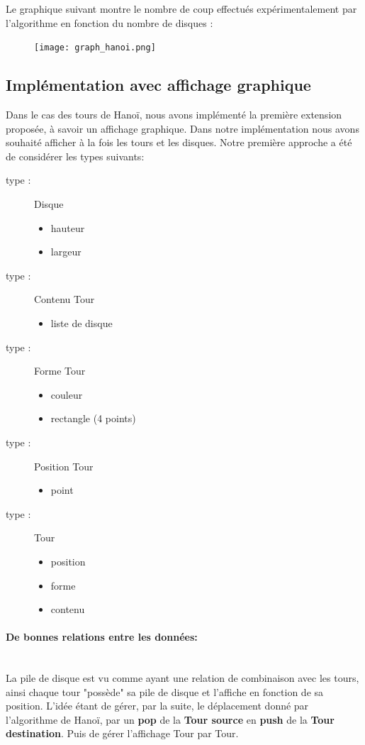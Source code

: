 \documentclass[a4paper,11pt]{article}
\begin{document}
Le graphique suivant montre le nombre de coup effectués expérimentalement par l'algorithme en fonction du nombre de disques :
\begin{figure}[h]
  \texttt{[image: graph\_hanoi.png]}
  \label{fig:graph_hanoi}
\end{figure}


\subsection{Implémentation avec affichage graphique}
Dans le cas des tours de Hanoï, nous avons implémenté la première extension proposée, à savoir un affichage graphique.
Dans notre implémentation nous avons souhaité afficher à la fois les tours et les disques.
Notre première approche a été de considérer les types suivants:

\begin{multicols}{3}
\begin{description}
\item[type :] Disque 
	\begin{itemize}
	\item hauteur
	\item largeur 
	\end{itemize}
\item[type :] Contenu Tour
	\begin{itemize}
	\item liste de disque
	\end{itemize}
\item[type :] Forme Tour
	\begin{itemize}
	\item couleur
	\item rectangle (4 points) 
	\end{itemize}
\item[type :]Position Tour
	\begin{itemize}
	\item point 
	\end{itemize}
\item [type :] Tour 
	\begin{itemize}
	\item position
	\item forme
	\item contenu 
	\end{itemize}
\end{description}
\end{multicols}
\paragraph{De bonnes relations entre les données:}\mbox{}\\
La pile de disque est vu comme ayant une relation de combinaison avec les tours, ainsi chaque tour  "possède" sa pile de disque et l'affiche en fonction de sa position.
L'idée étant de gérer, par la suite, le déplacement donné par l'algorithme de Hanoï, par un \textbf{pop} de la \textbf{Tour source} en \textbf{push} de la \textbf{Tour destination}.
Puis de gérer l'affichage Tour par Tour. 
\end{document}
